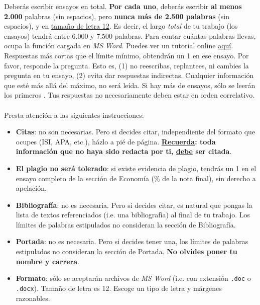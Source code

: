 \documentclass{article}
\begin{document}
Deber\'as escribir {\unskip} ensayos en total. {\bf Por cada uno}, deber\'as escribir {\bf al menos 2.000} palabras (sin espacios), pero {\bf nunca m\'as de 2.500 palabras} (sin espacios), y en \underline{tama\~no de letra 12}. Es decir, el largo \emph{total} de tu trabajo (los {\unskip} ensayos) tendr\'a entre 6.000 y 7.500 palabras. Para contar cu\'antas palabras llevas, ocupa la funci\'on cargada en \emph{MS Word}. Puedes ver un tutorial online \href{http://www.youtube.com/watch?v=I-dHsTvLe3M}{aqu\'i}. Respuestas m\'as cortas que el l\'imite m\'inimo, obtendr\'an un 1 en ese ensayo. Por favor, responde la pregunta. Esto es, (1) no reescribas, replantees, ni cambies la pregunta en tu ensayo, (2) evita dar respuestas indirectas. Cualquier informaci\'on que est\'e m\'as all\'a del m\'aximo, no ser\'a le\'ida. Si hay m\'as de {\unskip} ensayos, s\'olo se leer\'an los primeros {\unskip}. Tus respuestas no necesariamente deben estar en orden correlativo.
\\
\\
Presta atenci\'on a las siguientes instrucciones:

\begin{itemize}
	\item {\bf Citas}: no son necesarias. Pero si decides citar, independiente del formato que ocupes (ISI, APA, etc.), h\'azlo a pi\'e de p\'agina. {\bf \underline{Recuerda}: toda informaci\'on que no haya sido redacta por ti, \underline{debe} ser citada}.
	\item {\bf El plagio no ser\'a tolerado}: si existe evidencia de plagio, tendr\'as un 1 en el ensayo completo de la secci\'on de Econom\'ia ({\unskip}\% de la nota final), sin derecho a apelaci\'on.
	\item {\bf Bibliograf\'ia}: no es necesaria. Pero si decides citar, es natural que pongas la lista de textos referenciados (i.e. una bibliograf\'ia) al final de tu trabajo. Los l\'imites de palabras estipulados no consideran la secci\'on de Bibliograf\'ia.
	\item {\bf Portada}: no es necesaria. Pero si decides tener una, los l\'imites de palabras estipulados no consideran la secci\'on de Portada. {\bf No olvides poner tu nombre y carrera}.
	\item {\bf Formato}: s\'olo se aceptar\'an archivos de \emph{MS Word} (i.e. con extensi\'on \texttt{.doc} o \texttt{.docx}). Tama\~no de letra es 12. Escoge un tipo de letra y m\'argenes razonables.
\end{itemize}
\end{document}
